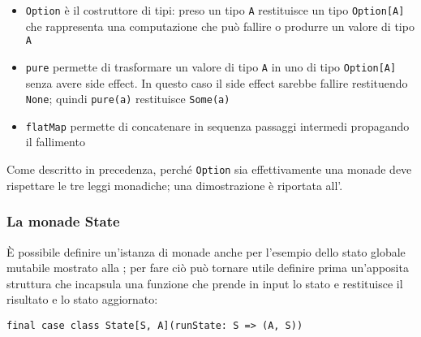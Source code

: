 \begin{itemize}
  \item \lstinline{Option} è il costruttore di tipi: preso un tipo \lstinline{A} restituisce un tipo \lstinline{Option[A]} che rappresenta una computazione che può fallire o produrre un valore di tipo \lstinline{A}
  \item \lstinline{pure} permette di trasformare un valore di tipo  \lstinline{A} in uno di tipo \lstinline{Option[A]} senza avere side effect. In questo caso il side effect sarebbe fallire restituendo \lstinline{None}; quindi \lstinline{pure(a)} restituisce \lstinline{Some(a)}
  \item \lstinline{flatMap} permette di concatenare in sequenza passaggi intermedi propagando il fallimento 
\end{itemize}

Come descritto in precedenza, perché \lstinline{Option} sia effettivamente una monade deve rispettare le tre leggi monadiche; una dimostrazione è riportata all'.

\subsubsection{La monade State}
\label{la-monade-state}

È possibile definire un'istanza di monade anche per l'esempio dello stato globale mutabile mostrato alla ; per fare ciò può tornare utile definire prima un'apposita struttura che incapsula una funzione che prende in input lo stato e restituisce il risultato e lo stato aggiornato:
\begin{lstlisting}[language=scala3]
final case class State[S, A](runState: S => (A, S))
\end{lstlisting}

